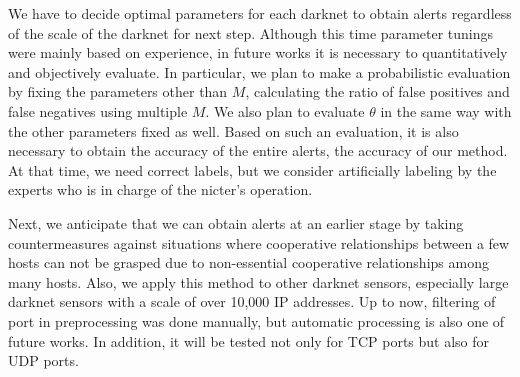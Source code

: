 \documentclass{sig-alternate-10pt}
\begin{document}
We have to decide optimal parameters for each darknet to obtain alerts regardless of the scale of the darknet for next step.
Although this time parameter tunings were mainly based on experience, in future works it is necessary to quantitatively and objectively evaluate.
In particular, we plan to make a probabilistic evaluation by fixing the parameters other than $M$, calculating the ratio of false positives and false negatives using multiple $M$.
We also plan to evaluate $\theta$ in the same way with the other parameters fixed as well.
Based on such an evaluation, it is also necessary to obtain the accuracy of the entire alerts, the accuracy of our method.
At that time, we need correct labels, but we consider artificially labeling by the experts who is in charge of the nicter's operation.

Next, we anticipate that we can obtain alerts at an earlier stage by taking countermeasures against situations where cooperative relationships between a few hosts can not be grasped due to non-essential cooperative relationships among many hosts.
Also, we apply this method to other darknet sensors, especially large darknet sensors with a scale of over 10,000 IP addresses.
Up to now, filtering of port in preprocessing was done manually, but automatic processing is also one of future works.
In addition, it will be tested not only for TCP ports but also for UDP ports.


\end{document}
